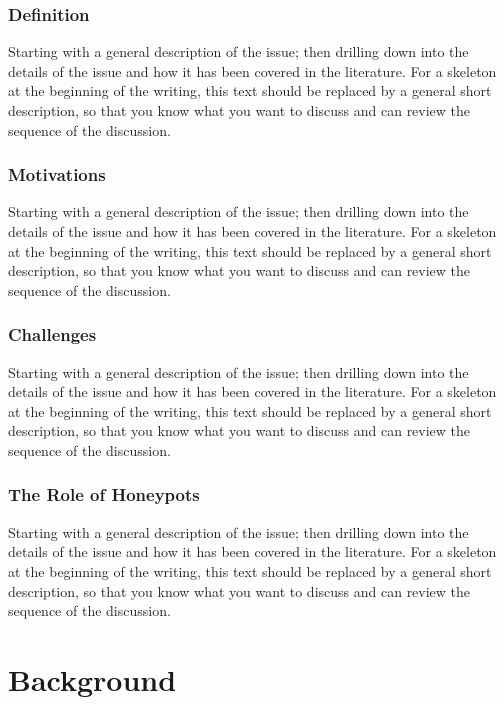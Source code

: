 \subsection{Definition}

Starting with a general description of the issue; then drilling down into the details of the issue and how it has been covered in the literature. For a skeleton at the beginning of the writing, this text should be replaced by a general short description, so that you know what you want to discuss and can review the sequence of the discussion.

\subsection{Motivations}

Starting with a general description of the issue; then drilling down into the details of the issue and how it has been covered in the literature. For a skeleton at the beginning of the writing, this text should be replaced by a general short description, so that you know what you want to discuss and can review the sequence of the discussion.

\subsection{Challenges}

Starting with a general description of the issue; then drilling down into the details of the issue and how it has been covered in the literature. For a skeleton at the beginning of the writing, this text should be replaced by a general short description, so that you know what you want to discuss and can review the sequence of the discussion.

\subsection{The Role of Honeypots}

Starting with a general description of the issue; then drilling down into the details of the issue and how it has been covered in the literature. For a skeleton at the beginning of the writing, this text should be replaced by a general short description, so that you know what you want to discuss and can review the sequence of the discussion.


\chapter{Background}

